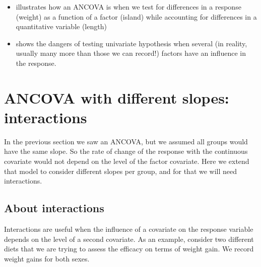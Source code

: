 \documentclass[
]{book}
\begin{document}
\begin{itemize}
\item
  illustrates how an ANCOVA is when we test for differences in a response (weight) as a function of a factor (island) while accounting for differences in a quantitative variable (length)
\item
  shows the dangers of testing univariate hypothesis when several (in reality, usually many more than those we can record!) factors have an influence in the response.
\end{itemize}

\chapter{ANCOVA with different slopes: interactions}\label{ANCOVAdifslopes}

In the previous section we saw an ANCOVA, but we assumed all groups would have the same slope. So the rate of change of the response with the continuous covariate would not depend on the level of the factor covariate. Here we extend that model to consider different slopes per group, and for that we will need interactions.

\section{About interactions}\label{about-interactions}

Interactions are useful when the influence of a covariate on the response variable depends on the level of a second covariate. As an example, consider two different diets that we are trying to assess the efficacy on terms of weight gain. We record weight gains for both sexes.
\end{document}
